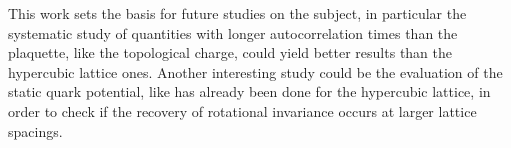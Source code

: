 This work sets the basis for future studies on the subject, in particular the systematic study of quantities with longer autocorrelation times than the plaquette, like the topological charge, could yield better results than the hypercubic lattice ones.
Another interesting study could be the evaluation of the static quark potential, like has already been done for the hypercubic lattice, in order to check if the recovery of rotational invariance occurs at larger lattice spacings.
